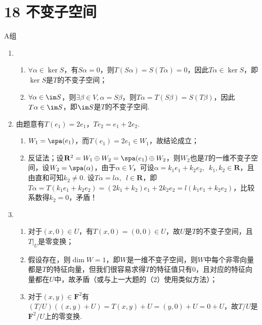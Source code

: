 \section*{18 不变子空间}

\vspace{2ex}

\centerline{\heiti A组}
\begin{enumerate}
    \item \begin{enumerate}
              \item $\forall\alpha\in\ker S$，有$S\alpha=0$，则$T(S\alpha)=S(T\alpha)=0$，因此$T\alpha\in\ker S$，即$\ker S$是$T$的不变子空间；

              \item $\forall\alpha\in\im S$，则$\exists\beta\in V, \alpha=S\beta$，则$T\alpha=T(S\beta)=S(T\beta)$，因此$T\alpha\in\im S$，即$\im S$是$T$的不变子空间.
          \end{enumerate}

    \item 由题意有$T(e_1)=2e_1$，$Te_2=e_1+2e_2$.
          \begin{enumerate}
              \item $W_1=\spa(e_1)$，而$T(e_1)=2e_1\in W_1$，故结论成立；

              \item 反证法；设$\mathbf{R}^2=W_1\oplus W_2=\spa(e_1)\oplus W_2$，则$W_2$也是$T$的一维不变子空间，设$W_2=\spa(\alpha)$，由于$\alpha\in V$，可设$\alpha=k_1e_1+k_2e_2,\enspace k_1,k_2\in\mathbf{R}$，且由直和可知$k_2\neq 0$. 设$T\alpha=l\alpha,\enspace l\in\mathbf{R}$，即$T\alpha=T(k_1e_1+k_2e_2)=(2k_1+k_2)e_1+2k_2e_2=l(k_1e_1+k_2e_2)$，比较系数得$k_2=0$，矛盾！
          \end{enumerate}

    \item \begin{enumerate}
              \item 对于$(x,0)\in U$，有$T(x,0)=(0,0)\in U$，故$U$是$T$的不变子空间，且$T\vert_U$是零变换；

              \item 假设存在，则$\dim W=1$，即$W$是一维不变子空间，则$W$中每个非零向量都是$T$的特征向量，但我们很容易求得$T$的特征值只有0，且对应的特征向量都在$U$中，故矛盾（或与上一大题的（2）使用类似方法）；

              \item 对于$(x,y)\in\mathbf{F}^2$有$(T/U)((x,y)+U)=T(x,y)+U=(y,0)+U=0+U$，故$T/U$是$\mathbf{F}^2/U$上的零变换.
          \end{enumerate}


\end{enumerate}
